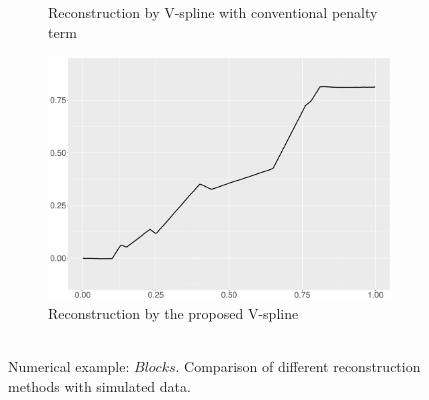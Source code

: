 \begin{figure}
\begin{subfigure}{0.45\textwidth}
    \caption{Reconstruction by V-spline with conventional penalty term}
    \end{subfigure}
    \begin{subfigure}{0.45\textwidth}
    \centering
    \includegraphics[width=\linewidth,height=0.45\textwidth]{Chapters/02TractorSplineTheory/plot/ggplot/ggBlocksTractor.pdf}
    \caption{Reconstruction by the proposed V-spline\\\mbox{  } }
    \end{subfigure}
\caption{Numerical example: $\textit{Blocks}$. Comparison of different reconstruction methods with simulated data.}\label{num1}
 \end{figure}

